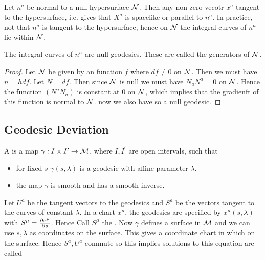 \documentclass{article}
\begin{document}
Let $n^a$ be normal to a null hypersurface $\mc{N}$. Then any non-zero vecotr $x^a$ tangent to the hypersurface, i.e. 
gives that $X^a$ is spacelike or parallel to $n^a$. In practice, not that $n^a$ is tangent to the hypersurface, hence on $\mc{N}$ the integral curves of $n^a$ lie within $\mc{N}$. 

\begin{prop}
The integral curves of $n^a$ are null geodesics. These are called the generators of $\mc{N}$. 
\end{prop}
\begin{proof}
Let $\mc{N}$ be given by an function $f$
where $df \neq  0$  on $\mc{N}$. Then we must have $n=h df$. Let $N=df$. Then since $\mc{N}$ is null we must have $N_a N^a = 0$ on $\mc{N}$. Hence the function $(N^a N_a)$ is constant at 0 on $\mc{N}$, which implies that the gradienft of this function is normal to $\mc{N}$. 
now we also have 
so a null geodesic. 
\end{proof}

\subsection{Geodesic Deviation}

\begin{definition}
A  is a map $\gamma : I\times I^\prime \to \mc{M}$, where $I,I^\prime$ are open intervals, such that 
\begin{itemize}
    \item for fixed $s$ $\gamma(s,\lambda)$ is a geodesic with affine parameter $\lambda$. 
    \item the map $\gamma$ is smooth and has a smooth inverse. 
\end{itemize}
\end{definition}

Let $U^a$ be the tangent vectors to the geodesics and $S^a$ be the vectors tangent to the curves of constant $\lambda$. In a chart $x^\mu$, the geodesics are specified by $x^\mu(s,\lambda)$ with $S^\mu = \pd[x^\mu]{s}$. Hence 
Call $S^\mu$ the . Now $\gamma$ defines a surface in $\mc{M}$ and we can use $s,\lambda$ as coordinates on the surface. This gives a coordinate chart in which  
on the surface. Hence $S^a, U^a$ commute 
so this implies 
solutions to this equation are called  
\end{document}
